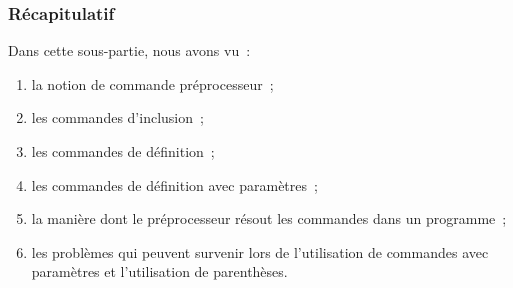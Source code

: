 \begin{frame}[fragile] \frametitle{Récapitulatif}
Dans cette sous-partie, nous avons vu~:

\begin{enumerate}
    \item la notion de commande préprocesseur~;
    \smallskip

    \item les commandes d'inclusion~;
    \smallskip

    \item les commandes de définition~;
    \smallskip

    \item les commandes de définition avec paramètres~;
    \smallskip

    \item la manière dont le préprocesseur résout les commandes dans
    un programme~;
    \smallskip

    \item les problèmes qui peuvent survenir lors de l'utilisation
    de commandes avec paramètres et l'utilisation de parenthèses.
\end{enumerate}
\end{frame}
